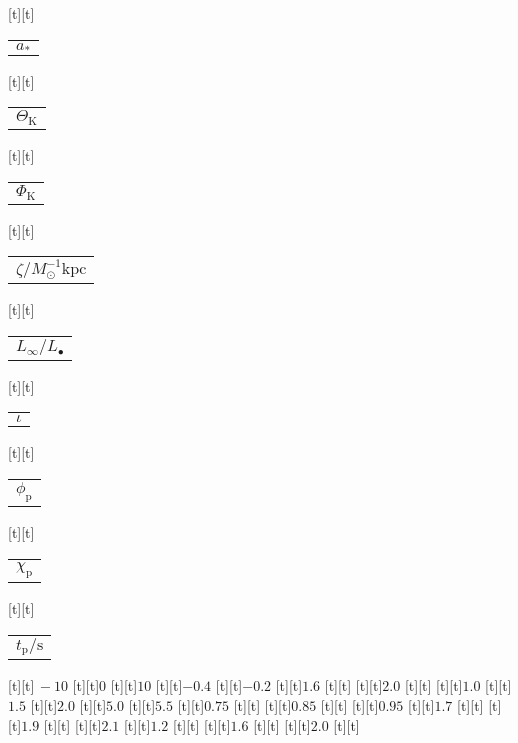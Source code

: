 \begin{psfrags}
[t][t]{\color[rgb]{0,0,0}\setlength{\tabcolsep}{0pt}\begin{tabular}{c}{$a_\ast$}\end{tabular}}%
[t][t]{\color[rgb]{0,0,0}\setlength{\tabcolsep}{0pt}\begin{tabular}{c}{$\Theta_\mathrm{K}$}\end{tabular}}%
[t][t]{\color[rgb]{0,0,0}\setlength{\tabcolsep}{0pt}\begin{tabular}{c}{$\Phi_\mathrm{K}$}\end{tabular}}%
[t][t]{\color[rgb]{0,0,0}\setlength{\tabcolsep}{0pt}\begin{tabular}{c}{$\zeta/M_\odot^{-1} \mathrm{kpc}$}\end{tabular}}%
[t][t]{\color[rgb]{0,0,0}\setlength{\tabcolsep}{0pt}\begin{tabular}{c}{$L_\infty/L_\bullet$}\end{tabular}}%
[t][t]{\color[rgb]{0,0,0}\setlength{\tabcolsep}{0pt}\begin{tabular}{c}{$\iota$}\end{tabular}}%
[t][t]{\color[rgb]{0,0,0}\setlength{\tabcolsep}{0pt}\begin{tabular}{c}{$\phi_\mathrm{p}$}\end{tabular}}%
[t][t]{\color[rgb]{0,0,0}\setlength{\tabcolsep}{0pt}\begin{tabular}{c}{$\chi_\mathrm{p}$}\end{tabular}}%
[t][t]{\color[rgb]{0,0,0}\setlength{\tabcolsep}{0pt}\begin{tabular}{c}{$t_\mathrm{p}/\mathrm{s}$}\end{tabular}}%
%
[t][t]{$\,-10$}%
[t][t]{$0$}%
[t][t]{$10$}%
[t][t]{$-0.4$}%
[t][t]{$-0.2$}%
[t][t]{$1.6$}%
[t][t]{}%
[t][t]{$2.0$}%
[t][t]{}%
[t][t]{$1.0$}%
[t][t]{$1.5$}%
[t][t]{$2.0$}%
[t][t]{$5.0$}%
[t][t]{$5.5$}%
[t][t]{$0.75$}%
[t][t]{}%
[t][t]{$0.85$}%
[t][t]{}%
[t][t]{$0.95$}%
[t][t]{$1.7$}%
[t][t]{}%
[t][t]{$1.9$}%
[t][t]{}%
[t][t]{$2.1$}%
[t][t]{$1.2$}%
[t][t]{}%
[t][t]{$1.6$}%
[t][t]{}%
[t][t]{$2.0$}%
[t][t]{}%

\end{psfrags}
